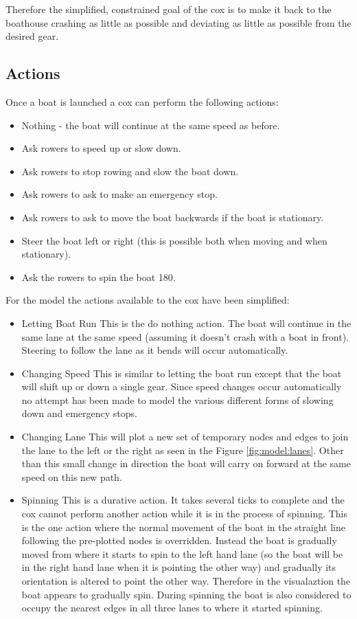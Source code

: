       Therefore the simplified, constrained goal of the cox is to make it back to the boathouse crashing as little as possible and deviating as little as possible from the desired gear.

      \subsection{Actions} \label{model:cox:actions}
      Once a boat is launched a cox can perform the following actions:
      \begin{itemize}
        \item Nothing - the boat will continue at the same speed as before.
        \item Ask rowers to speed up or slow down.
        \item Ask rowers to stop rowing and slow the boat down.
        \item Ask rowers to ask to make an emergency stop.
        \item Ask rowers to ask to move the boat backwards if the boat is stationary.
        \item Steer the boat left or right (this is possible both when moving and when stationary).
        \item Ask the rowers to spin the boat 180\textdegree.
      \end{itemize}
        
      For the model the actions available to the cox have been simplified:
      \begin{itemize}
        \item{Letting Boat Run} This is the do nothing action. The boat will continue in the same lane at the same speed (assuming it doesn't crash with a boat in front). Steering to follow the lane as it bends will occur automatically.
        \item{Changing Speed} This is similar to letting the boat run except that the boat will shift up or down a single gear. Since speed changes occur automatically no attempt has been made to model the various different forms of slowing down and emergency stops.
        \item{Changing Lane} This will plot a new set of temporary nodes and edges to join the lane to the left or the right as seen in the Figure \ref{fig:model:lanes}. Other than this small change in direction the boat will carry on forward at the same speed on this new path.
        \item{Spinning} This is a durative action. It takes several ticks to complete and the cox cannot perform another action while it is in the process of spinning. This is the one action where the normal movement of the boat in the straight line following the pre-plotted nodes  is overridden. Instead the boat is gradually moved from where it starts to spin to the left hand lane (so the boat will be in the right hand lane when it is pointing the other way) and gradually its orientation is altered to point the other way. Therefore in the visualaztion the boat appears to gradually spin. During spinning the boat is also considered to occupy the nearest edges in all three lanes to where it started spinning.
      \end{itemize}
      
